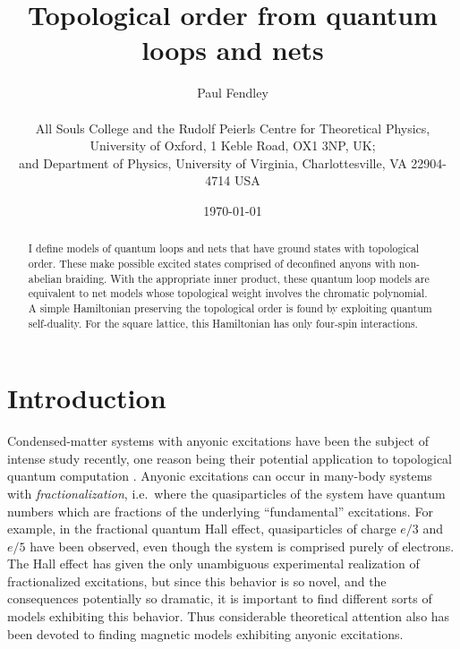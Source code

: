 \documentclass[11pt]{article}
\begin{document}
 


 
\title{Topological order from quantum loops and nets}

\author{Paul Fendley\\
\\
All Souls College and the Rudolf Peierls Centre for Theoretical
Physics,\\ University of Oxford, 1 Keble Road,  OX1 3NP, UK;\\
and Department of Physics, University of Virginia,
Charlottesville, VA 22904-4714 USA
}
 
\date{\today} 

\maketitle

\begin{abstract} 
I define models of quantum loops and nets that have ground states with
topological order. These make possible excited states comprised of
deconfined anyons with non-abelian braiding.  With the appropriate
inner product, these quantum loop models are equivalent to net models
whose topological weight involves the chromatic polynomial. A simple
Hamiltonian preserving the topological order is found by exploiting
quantum self-duality. For the square lattice, this Hamiltonian has
only four-spin interactions.

\end{abstract} 


\section{Introduction}

Condensed-matter systems with anyonic excitations have been the
subject of intense study recently, one reason being their potential
application to topological quantum computation \cite{DFNSS}. Anyonic
excitations can occur in many-body systems with {\em
  fractionalization}, i.e.\ where the quasiparticles of the system
have quantum numbers which are fractions of the underlying
``fundamental'' excitations. For example, in the fractional quantum
Hall effect, quasiparticles of charge $e/3$ and $e/5$ have been
observed, even though the system is comprised purely of electrons.
The Hall effect has given the only unambiguous experimental
realization of fractionalized excitations, but since this behavior is
so novel, and the consequences potentially so dramatic, it is
important to find different sorts of models exhibiting this behavior.
Thus considerable theoretical attention also has been devoted to
finding magnetic models exhibiting anyonic excitations.
\end{document}
